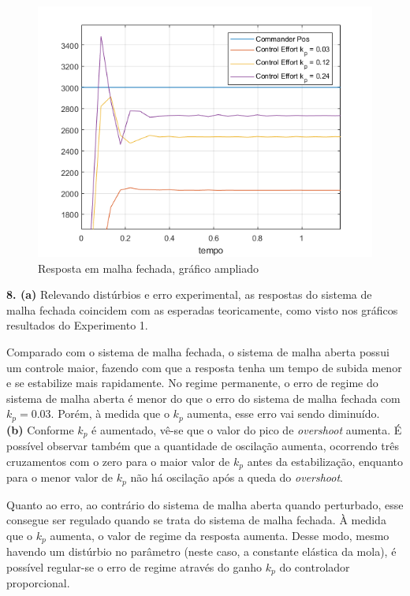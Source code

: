 \documentclass[a4paper,11pt]{article}
\begin{document}
\begin{figure}[H]
\centering
\includegraphics{exp02e07-fechada-zoom}
\caption{Resposta em malha fechada, gráfico ampliado}
\end{figure}

\hspace{5pt}

\textbf{8. (a)}
Relevando distúrbios e erro experimental, as respostas do
sistema de malha fechada coincidem com as esperadas teoricamente, como visto nos
gráficos resultados do Experimento 1.

Comparado com o sistema de malha fechada, o sistema de malha aberta possui um
controle maior, fazendo com que a resposta tenha um tempo de subida menor e se
estabilize mais rapidamente.
No regime permanente, o erro de regime do sistema de malha aberta é menor do que
o erro do sistema de malha fechada com $k_p = 0.03$. Porém, à medida que o $k_p$
aumenta, esse erro vai sendo diminuído. \\

\textbf{(b)}
Conforme $k_p$ é aumentado, vê-se que o valor do pico de \textit{overshoot}
aumenta. É possível observar também que a quantidade de oscilação aumenta,
ocorrendo três cruzamentos com o zero para o maior valor de $k_p$ antes da
estabilização, enquanto para o menor valor de $k_p$ não há oscilação após a
queda do \textit{overshoot}.

Quanto ao erro, ao contrário do sistema de malha aberta quando perturbado, esse
consegue ser regulado quando se trata do sistema de malha fechada. À medida que
o $k_p$ aumenta, o valor de regime da resposta aumenta. Desse modo, mesmo
havendo um distúrbio no parâmetro (neste caso, a constante elástica da mola), é
possível regular-se o erro de regime através do ganho $k_p$ do controlador
proporcional.
\end{document}
